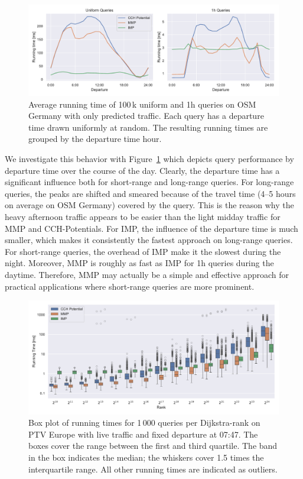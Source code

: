 \documentclass[a4paper,UKenglish,cleveref, autoref, thm-restate,anonymous]{lipics-v2021}
\begin{document}
\begin{figure}[tbh]
\centering
\includegraphics[width=\linewidth]{fig/perf_over_day.pdf}
\caption{
Average running time of 100\,k uniform and 1h queries on OSM Germany with only predicted traffic.
Each query has a departure time drawn uniformly at random.
The resulting running times are grouped by the departure time hour.
}\label{fig:by_dep}
\end{figure}

We investigate this behavior with Figure~\ref{fig:by_dep} which depicts query performance by departure time over the course of the day.
Clearly, the departure time has a significant influence both for short-range and long-range queries.
For long-range queries, the peaks are shifted and smeared because of the travel time (4--5 hours on average on OSM Germany) covered by the query.
This is the reason why the heavy afternoon traffic appears to be easier than the light midday traffic for MMP and CCH-Potentials.
For IMP, the influence of the departure time is much smaller, which makes it consistently the fastest approach on long-range queries.
For short-range queries, the overhead of IMP make it the slowest during the night.
Moreover, MMP is roughly as fast as IMP for 1h queries during the daytime.
Therefore, MMP may actually be a simple and effective approach for practical applications where short-range queries are more prominent.

\begin{figure}[!b]
\centering
\includegraphics[width=\linewidth]{fig/ranks.pdf}
\caption{
Box plot of running times for 1\,000 queries per Dijkstra-rank on PTV Europe with live traffic and fixed departure at 07:47.
The boxes cover the range between the first and third quartile.
The band in the box indicates the median; the whiskers cover 1.5 times the interquartile range.
All other running times are indicated as outliers.
}\label{fig:ranks}
\end{figure}
\end{document}

